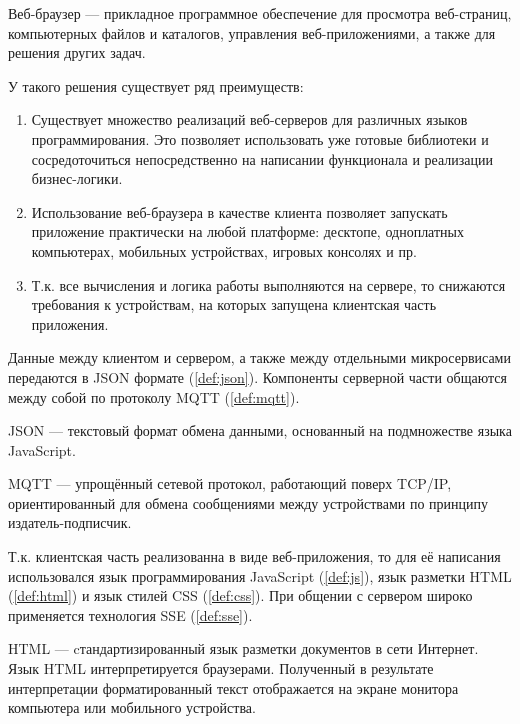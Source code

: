 \begin{definition}
    \label{def:web-browser}
    Веб-браузер — прикладное программное обеспечение для просмотра веб-страниц, компьютерных файлов и каталогов,
    управления веб-приложениями, а также для решения других задач.
\end{definition}

\noindent У такого решения существует ряд преимуществ:

\begin{enumerate}
    \item Существует множество реализаций веб-серверов для различных языков программирования.
    Это позволяет использовать уже готовые библиотеки и сосредоточиться непосредственно на написании функционала
    и реализации бизнес-логики.
    \item Использование веб-браузера в качестве клиента позволяет запускать приложение практически на любой платформе:
    десктопе, одноплатных компьютерах, мобильных устройствах, игровых консолях и пр.
    \item Т.к. все вычисления и логика работы выполняются на сервере, то снижаются требования к устройствам, на которых
    запущена клиентская часть приложения.
\end{enumerate}

\noindent Данные между клиентом и сервером, а также между отдельными микросервисами передаются в JSON формате
(\ref{def:json}). Компоненты серверной части общаются между собой по протоколу MQTT (\ref{def:mqtt}).

\begin{definition}
    \label{def:json}
    JSON — текстовый формат обмена данными, основанный на подмножестве языка JavaScript.
\end{definition}

\begin{definition}
    \label{def:mqtt}
    MQTT — упрощённый сетевой протокол, работающий поверх TCP/IP, ориентированный для обмена сообщениями между устройствами
    по принципу издатель-подписчик. 
\end{definition}

\noindent Т.к. клиентская часть реализованна в виде веб-приложения, то для её написания использовался язык программирования
JavaScript (\ref{def:js}), язык разметки HTML (\ref{def:html}) и язык стилей CSS (\ref{def:css}). При общении с сервером
широко применяется технология SSE (\ref{def:sse}).

\begin{definition}
    \label{def:html}
    HTML — cтандартизированный язык разметки документов в сети Интернет.
    Язык HTML интерпретируется браузерами. Полученный в результате интерпретации форматированный текст
    отображается на экране монитора компьютера или мобильного устройства.
\end{definition}

